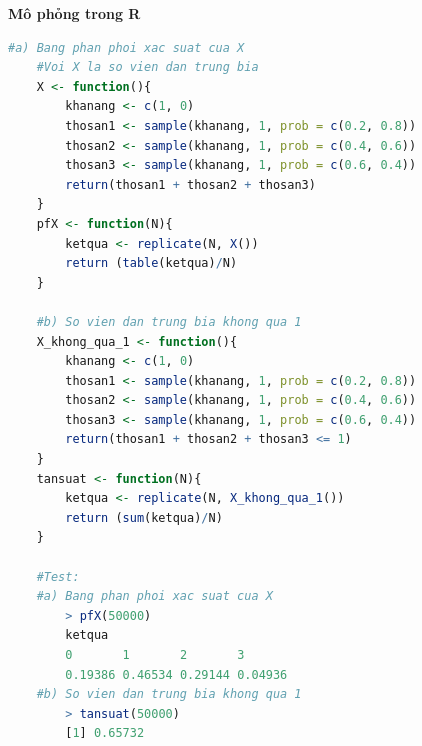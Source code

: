 \documentclass[a4paper,12pt]{article}
\begin{document}
{\large\textbf{Mô phỏng trong R}} \\
\begin{lstlisting}[language=R]
	#a) Bang phan phoi xac suat cua X
	#Voi X la so vien dan trung bia
	X <- function(){
		khanang <- c(1, 0)
		thosan1 <- sample(khanang, 1, prob = c(0.2, 0.8))
		thosan2 <- sample(khanang, 1, prob = c(0.4, 0.6))
		thosan3 <- sample(khanang, 1, prob = c(0.6, 0.4))
		return(thosan1 + thosan2 + thosan3)
	}
	pfX <- function(N){
		ketqua <- replicate(N, X())
		return (table(ketqua)/N)
	}
	
	#b) So vien dan trung bia khong qua 1 
	X_khong_qua_1 <- function(){
 		khanang <- c(1, 0)
		thosan1 <- sample(khanang, 1, prob = c(0.2, 0.8))
		thosan2 <- sample(khanang, 1, prob = c(0.4, 0.6))
		thosan3 <- sample(khanang, 1, prob = c(0.6, 0.4))
		return(thosan1 + thosan2 + thosan3 <= 1)
	}
	tansuat <- function(N){
		ketqua <- replicate(N, X_khong_qua_1())
		return (sum(ketqua)/N)
	}
	
	#Test:
	#a) Bang phan phoi xac suat cua X
		> pfX(50000)
		ketqua
		0       1       2       3 
		0.19386 0.46534 0.29144 0.04936
	#b) So vien dan trung bia khong qua 1
		> tansuat(50000)
		[1] 0.65732
	
\end{lstlisting}
\end{document}
